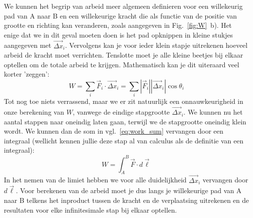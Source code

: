 We kunnen het begrip van arbeid meer algemeen definieren voor een willekeurig pad van
A naar B en een willekeurige kracht die als functie van de positie van grootte en richting 
kan veranderen, zoals aangegeven in Fig.~\ref{fig:W}~b). Het enige dat we in dit 
geval moeten doen is het pad opknippen in kleine stukjes aangegeven met $\vec{\Delta x}_i$. 
Vervolgens kan je voor ieder klein stapje uitrekenen hoeveel arbeid de kracht moet
verrichten. Tenslotte moet je alle kleine beetjes bij elkaar optellen om de totale arbeid te
krijgen. Mathematisch kan je dit uiteraard veel korter 'zeggen':
\begin{equation}\label{eq:work_sum}
W = \sum_i \vec{F}_i \cdot \vec{\Delta x}_i = \sum_i |\vec{F}_i||\vec{\Delta x}_i|\cos\theta_i
\end{equation}
Tot nog toe niets verrassend, maar we er zit natuurlijk een onnauwkeurigheid in onze
berekening van $W$, vanwege de eindige stapgrootte $\vec{\Delta x}_i$. We kunnen
nu het aantal stappen naar oneindig laten gaan, terwijl we de stapgrootte oneindig
klein wordt. We kunnen dan de som in vgl.~\ref{eq:work_sum} vervangen door een
integraal (wellicht kennen jullie deze stap al van calculus als de definitie van een integraal):
\begin{equation}\label{eq:defwork}
W = \int_A^B \vec{F}\cdot d\vec{\ell}
\end{equation} 
In het nemen van de limiet hebben we voor alle duidelijkheid $\vec{\Delta x}_i$ vervangen
door $d\vec{\ell}$.
Voor berekenen van de arbeid moet je dus langs je willekeurige pad van A naar B telkens
het inproduct tussen de kracht en de verplaatsing uitrekenen en de resultaten voor elke infinitesimale stap bij elkaar optellen.

